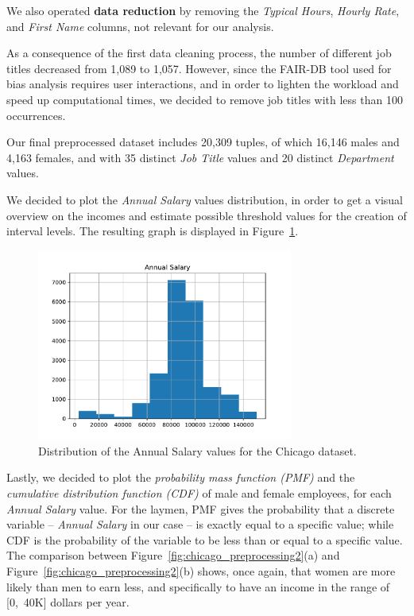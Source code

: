 We also operated \textbf{data reduction} by removing the \textit{Typical Hours}, \textit{Hourly Rate}, and \textit{First Name} columns, not relevant for our analysis.

As a consequence of the first data cleaning process, the number of different job titles decreased from 1,089 to 1,057. However, since the FAIR-DB tool used for bias analysis requires user interactions, and in order to lighten the workload and speed up computational times, we decided to remove job titles with less than 100 occurrences.

Our final preprocessed dataset includes 20,309 tuples, of which 16,146 males and 4,163 females, and with 35 distinct \textit{Job Title} values and 20 distinct \textit{Department} values.

We decided to plot the \textit{Annual Salary} values distribution, in order to get a visual overview on the incomes and estimate possible threshold values for the creation of interval levels. The resulting graph is displayed in Figure~\ref{fig:chicago_preprocessing1}.

\begin{figure}[t!]
\centering
\includegraphics[width=0.75\textwidth]{figures/chicago_annual_salary_distribution.pdf}
\caption{Distribution of the \textrm{Annual Salary} values for the Chicago dataset.}
\label{fig:chicago_preprocessing1}
\end{figure}

Lastly, we decided to plot the \textit{probability mass function (PMF)} and the \textit{cumulative distribution function (CDF)} of male and female employees, for each \textit{Annual Salary} value. For the laymen, PMF gives the probability that a discrete variable -- \textit{Annual Salary} in our case -- is exactly equal to a specific value; while CDF is the probability of the variable to be less than or equal to a specific value. The comparison between Figure~\ref{fig:chicago_preprocessing2}(a) and Figure~\ref{fig:chicago_preprocessing2}(b) shows, once again, that women are more likely than men to earn less, and specifically to have an income in the range of [0,~40K] dollars per year.

